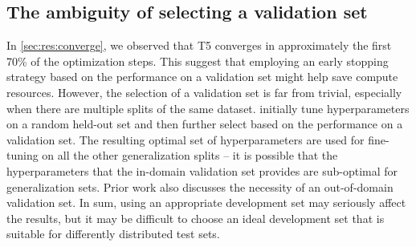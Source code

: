
\subsection{The ambiguity of selecting a validation set}
\label{sec:dis:hp-tuning}
In \cref{sec:res:converge}, we observed that T5 converges in approximately the first 70\% of the optimization steps.
This suggest that employing an early stopping strategy based on the performance on a validation set might help save compute resources. 
However, the selection of a validation set is far from trivial, especially when there are multiple splits of the same dataset. 
\cite{shaw-etal-2021-compositional} initially tune hyperparameters on a random held-out set and then further select based on the performance on a validation set. 
The resulting optimal set of hyperparameters are used for fine-tuning on all the other generalization splits -- it is possible that the hyperparameters that the in-domain validation set provides are sub-optimal for generalization sets.
Prior work \cite{csordas2021devil} also discusses the necessity of an out-of-domain validation set.
In sum, using an appropriate development set may seriously affect the results, but it may be difficult to choose an ideal development set that is suitable for differently distributed test sets.



